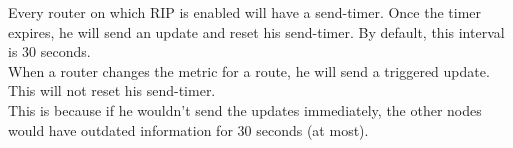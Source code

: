 Every router on which RIP is enabled will have a send-timer. Once the timer expires, he will send an update and reset his send-timer. By default, this interval is 30 seconds. \\
When a router changes the metric for a route, he will send a triggered update. This will not reset his send-timer. \\
This is because if he wouldn't send the updates immediately, the other nodes would have outdated information for 30 seconds (at most).